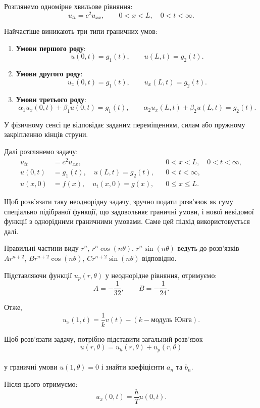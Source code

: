 \documentclass[
  ukrainian,
]{article}
\begin{document}
Розглянемо одномірне хвильове рівняння: \[
u_{tt} = c^2 u_{xx}, \qquad 0 < x < L,\quad 0 < t < \infty.
\]

Найчастіше виникають три типи граничних умов:

\begin{enumerate}
\def\labelenumi{\arabic{enumi}.}
\item
  \textbf{Умови першого роду}: \[
  u(0,t)=g_1(t), \qquad u(L,t)=g_2(t).
  \]
\item
  \textbf{Умови другого роду}: \[
  u_x(0,t)=g_1(t), \qquad u_x(L,t)=g_2(t).
  \]
\item
  \textbf{Умови третього роду}: \[
  \alpha_1 u_x(0,t)+\beta_1 u(0,t)=g_1(t), \qquad
  \alpha_2 u_x(L,t)+\beta_2 u(L,t)=g_2(t).
  \]
\end{enumerate}

У фізичному сенсі це відповідає заданим переміщенням, силам або пружному
закріпленню кінців струни.

Далі розглянемо задачу: \[
\begin{aligned}
u_{tt} &= c^2u_{xx}, && 0 < x < L,\quad 0 < t < \infty, \\
u(0,t) &= g_1(t), \quad u(L,t) = g_2(t), && 0 < t < \infty, \\
u(x,0) &= f(x), \quad u_t(x,0) = g(x), && 0 \leqslant x \leqslant L.
\end{aligned}
\]

Щоб розв'язати таку неоднорідну задачу, зручно подати розв'язок як суму
спеціально підібраної функції, що задовольняє граничні умови, і нової
невідомої функції з однорідними граничними умовами. Саме цей підхід
використовується далі.

Правильні частини виду \(r^n\), \(r^n \cos(n\theta)\),
\(r^n \sin(n\theta)\) ведуть до розв'язків\\
\(Ar^{n+2}\), \(Br^{n+2} \cos(n\theta)\), \(Cr^{n+2} \sin(n\theta)\)
відповідно.

Підставляючи функції \(u_p(r,\theta)\) у неоднорідне рівняння,
отримуємо: \[
A = -\frac{1}{32}, \qquad B = -\frac{1}{24}.
\]

Отже, \[
u_x(1,t) = \frac{1}{k} v(t) - (k - \text{модуль Юнга}).
\]

Щоб розв'язати задачу, потрібно підставити загальний розв'язок\\
\[
u(r,\theta)=u_h(r,\theta)+u_p(r,\theta)
\]\\
у граничні умови \(u(1,\theta)=0\) і знайти коефіцієнти \(a_n\) та
\(b_n\).

Після цього отримуємо: \[
u_x(0,t) = \frac{h}{T} u(0,t).
\]
\end{document}
